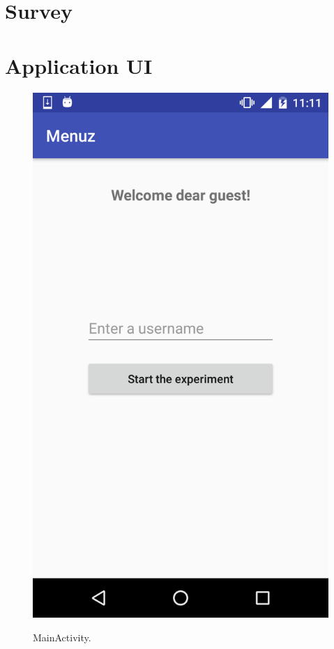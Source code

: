 \appendix

\chapter{Survey} \label{survey}


\chapter{Application UI} \label{screenshots}

\newpage

\begin{figure}[!ht]
  \begin{center}
    \includegraphics[scale=0.22]{img/main_activity.png}
    \label{fig:main_activity}
    \caption{MainActivity.}
  \end{center}
\end{figure}

